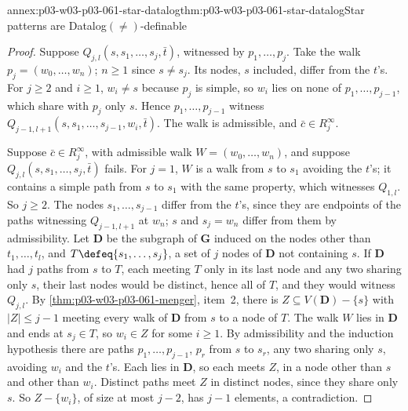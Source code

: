 \begin{annexitem}{annex:p03-w03-p03-061-star-datalog}{thm:p03-w03-p03-061-star-datalog}{Star patterns are Datalog\((\neq)\)-definable}
\begin{proof}
Suppose \(Q_{j,l}(s,s_1,\ldots,s_j,\bar t)\), witnessed by
\(p_1,\ldots,p_j\). Take the walk \(p_j=(w_0,\ldots,w_n)\); \(n\ge1\) since
\(s\neq s_j\). Its nodes, \(s\) included, differ from the \(t\)'s. For
\(j\ge2\) and \(i\ge1\), \(w_i\neq s\) because \(p_j\) is simple, so \(w_i\)
lies on none of \(p_1,\ldots,p_{j-1}\), which share with \(p_j\) only \(s\).
Hence \(p_1,\ldots,p_{j-1}\) witness
\(Q_{j-1,l+1}(s,s_1,\ldots,s_{j-1},w_i,\bar t)\). The walk is admissible,
and \(\bar c\in R_j^\infty\).

Suppose \(\bar c\in R_j^\infty\), with admissible walk
\(W=(w_0,\ldots,w_n)\), and suppose \(Q_{j,l}(s,s_1,\ldots,s_j,\bar t)\)
fails. For \(j=1\), \(W\) is a walk from \(s\) to \(s_1\) avoiding the
\(t\)'s; it contains a simple path from \(s\) to \(s_1\) with the same
property, which witnesses \(Q_{1,l}\). So \(j\ge2\). The nodes
\(s_1,\ldots,s_{j-1}\) differ from the \(t\)'s, since they are endpoints of
the paths witnessing \(Q_{j-1,l+1}\) at \(w_n\); \(s\) and \(s_j=w_n\) differ
from them by admissibility. Let \(\mathbf D\) be the subgraph of
\(\mathbf G\) induced on the nodes other than \(t_1,\ldots,t_l\), and
\(T\defeq\{s_1,\ldots,s_j\}\), a set of \(j\) nodes of \(\mathbf D\) not
containing \(s\). If \(\mathbf D\) had \(j\) paths from \(s\) to \(T\), each
meeting \(T\) only in its last node and any two sharing only \(s\), their
last nodes would be distinct, hence all of \(T\), and they would witness
\(Q_{j,l}\). By \cref{thm:p03-w03-p03-061-menger}, item~2, there is
\(Z\subseteq V(\mathbf D)-\{s\}\) with \(|Z|\le j-1\) meeting every walk of
\(\mathbf D\) from \(s\) to a node of \(T\). The walk \(W\) lies in
\(\mathbf D\) and ends at \(s_j\in T\), so \(w_i\in Z\) for some \(i\ge1\).
By admissibility and the induction hypothesis there are paths
\(p_1,\ldots,p_{j-1}\), \(p_r\) from \(s\) to \(s_r\), any two sharing only
\(s\), avoiding \(w_i\) and the \(t\)'s. Each lies in \(\mathbf D\), so each
meets \(Z\), in a node other than \(s\) and other than \(w_i\). Distinct
paths meet \(Z\) in distinct nodes, since they share only \(s\). So
\(Z-\{w_i\}\), of size at most \(j-2\), has \(j-1\) elements, a
contradiction.


\end{proof}
\end{annexitem}
